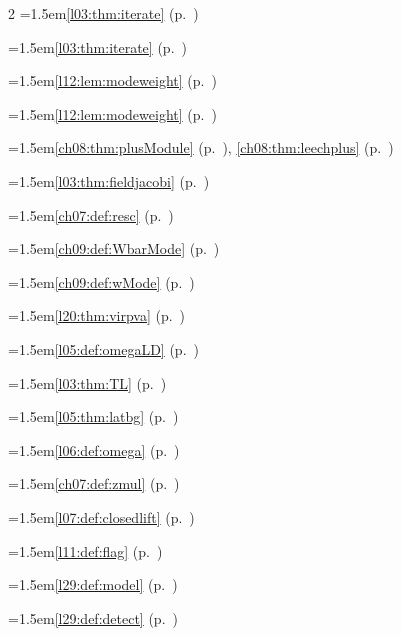 \begin{multicols}{2}
\hangindent=1.5em\quad \ref{l03:thm:iterate} (p.~\pageref{l03:thm:iterate})\par
\hangindent=1.5em\quad \ref{l03:thm:iterate} (p.~\pageref{l03:thm:iterate})\par
\hangindent=1.5em\quad \ref{l12:lem:modeweight} (p.~\pageref{l12:lem:modeweight})\par
\hangindent=1.5em\quad \ref{l12:lem:modeweight} (p.~\pageref{l12:lem:modeweight})\par
\hangindent=1.5em\quad \ref{ch08:thm:plusModule} (p.~\pageref{ch08:thm:plusModule}), \ref{ch08:thm:leechplus} (p.~\pageref{ch08:thm:leechplus})\par
\hangindent=1.5em\quad \ref{l03:thm:fieldjacobi} (p.~\pageref{l03:thm:fieldjacobi})\par
\hangindent=1.5em\quad \ref{ch07:def:resc} (p.~\pageref{ch07:def:resc})\par
\hangindent=1.5em\quad \ref{ch09:def:WbarMode} (p.~\pageref{ch09:def:WbarMode})\par
\hangindent=1.5em\quad \ref{ch09:def:wMode} (p.~\pageref{ch09:def:wMode})\par
\hangindent=1.5em\quad \ref{l20:thm:virpva} (p.~\pageref{l20:thm:virpva})\par
\hangindent=1.5em\quad \ref{l05:def:omegaLD} (p.~\pageref{l05:def:omegaLD})\par
\hangindent=1.5em\quad \ref{l03:thm:TL} (p.~\pageref{l03:thm:TL})\par
\hangindent=1.5em\quad \ref{l05:thm:latbg} (p.~\pageref{l05:thm:latbg})\par
\hangindent=1.5em\quad \ref{l06:def:omega} (p.~\pageref{l06:def:omega})\par
\hangindent=1.5em\quad \ref{ch07:def:zmul} (p.~\pageref{ch07:def:zmul})\par
\hangindent=1.5em\quad \ref{l07:def:closedlift} (p.~\pageref{l07:def:closedlift})\par
\hangindent=1.5em\quad \ref{l11:def:flag} (p.~\pageref{l11:def:flag})\par
\hangindent=1.5em\quad \ref{l29:def:model} (p.~\pageref{l29:def:model})\par
\hangindent=1.5em\quad \ref{l29:def:detect} (p.~\pageref{l29:def:detect})\par

\end{multicols}
